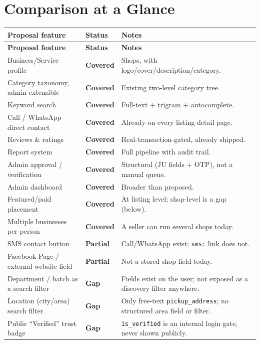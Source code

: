 \documentclass[11pt]{article}
\newcommand{\statuscovered}{\textcolor{covered}{\textbf{Covered}}}
\newcommand{\statuspartial}{\textcolor{partial}{\textbf{Partial}}}
\newcommand{\statusgap}{\textcolor{gap}{\textbf{Gap}}}
\begin{document}
\section{Comparison at a Glance}

\begin{longtable}{@{}p{5.6cm}p{1.7cm}p{7.6cm}@{}}
\toprule
\textbf{Proposal feature} & \textbf{Status} & \textbf{Notes} \\
\midrule
\endfirsthead
\toprule
\textbf{Proposal feature} & \textbf{Status} & \textbf{Notes} \\
\midrule
\endhead
Business/Service profile & \statuscovered & Shops, with logo/cover/description/category. \\
Category taxonomy, admin-extensible & \statuscovered & Existing two-level category tree. \\
Keyword search & \statuscovered & Full-text + trigram + autocomplete. \\
Call / WhatsApp direct contact & \statuscovered & Already on every listing detail page. \\
Reviews \& ratings & \statuscovered & Real-transaction-gated, already shipped. \\
Report system & \statuscovered & Full pipeline with audit trail. \\
Admin approval / verification & \statuscovered & Structural (JU fields + OTP), not a manual queue. \\
Admin dashboard & \statuscovered & Broader than proposed. \\
Featured/paid placement & \statuscovered & At listing level; shop-level is a gap (below). \\
Multiple businesses per person & \statuscovered & A seller can run several shops today. \\
SMS contact button & \statuspartial & Call/WhatsApp exist; \texttt{sms:} link does not. \\
Facebook Page / external website field & \statuspartial & Not a stored shop field today. \\
Department / batch as a search filter & \statusgap & Fields exist on the user; not exposed as a discovery filter anywhere. \\
Location (city/area) search filter & \statusgap & Only free-text \texttt{pickup\_address}; no structured area field or filter. \\
Public ``Verified'' trust badge & \statusgap & \texttt{is\_verified} is an internal login gate, never shown publicly. \\

\end{longtable}
\end{document}
